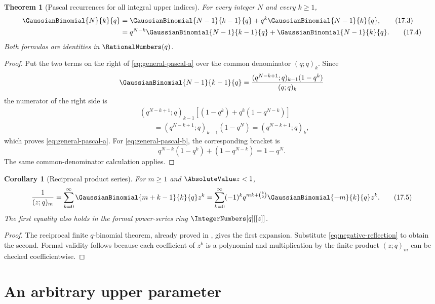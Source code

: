 \documentclass[11pt,a4paper,oneside,openany]{book}
\newtheorem{theorem}{Theorem}[chapter]
\newtheorem{corollary}[corollary]{Corollary}
\theoremstyle{definition}
\theoremstyle{remark}
\begin{document}
\begin{theorem}[Pascal recurrences for all integral upper indices]\label{thm:generalized-pascal}
For every integer $N$ and every $k\ge1$,
\begin{align}
 \GaussianBinomial{N}{k}{q}
 &=\GaussianBinomial{N-1}{k-1}{q}+q^k\GaussianBinomial{N-1}{k}{q},
 \tag{17.3}\label{eq:general-pascal-a}\\
 &=q^{N-k}\GaussianBinomial{N-1}{k-1}{q}+\GaussianBinomial{N-1}{k}{q}.
 \tag{17.4}\label{eq:general-pascal-b}
\end{align}
Both formulas are identities in $\RationalNumbers(q)$.
\end{theorem}

\begin{proof}
Put the two terms on the right of \eqref{eq:general-pascal-a} over the common denominator $(q;q)_k$.  Since
\[
 \GaussianBinomial{N-1}{k-1}{q}
 =\frac{(q^{N-k+1};q)_{k-1}(1-q^k)}{(q;q)_k}
\]
the numerator of the right side is
\begin{align*}
 &(q^{N-k+1};q)_{k-1}
 \left[(1-q^k)+q^k(1-q^{N-k})\right]\\
 &\qquad=(q^{N-k+1};q)_{k-1}(1-q^N)
 =(q^{N-k+1};q)_k,
\end{align*}
which proves \eqref{eq:general-pascal-a}.  For \eqref{eq:general-pascal-b}, the corresponding bracket is
\[
 q^{N-k}(1-q^k)+(1-q^{N-k})=1-q^N.
\]
The same common-denominator calculation applies.
\end{proof}

\begin{corollary}[Reciprocal product series]\label{cor:reciprocal-product-negative}
For $m\ge1$ and $\AbsoluteValue z<1$,
\[
 \frac1{(z;q)_m}
 =\sum_{k=0}^{\infty}\GaussianBinomial{m+k-1}{k}{q} z^k
 =\sum_{k=0}^{\infty}(-1)^kq^{mk+\binom k2}
   \GaussianBinomial{-m}{k}{q}z^k.
 \tag{17.5}\label{eq:negative-reciprocal-series}
\]
The first equality also holds in the formal power-series ring $\IntegerNumbers[q][[z]]$.
\end{corollary}

\begin{proof}
The reciprocal finite $q$-binomial theorem, already proved in , gives the first expansion.  Substitute \eqref{eq:negative-reflection} to obtain the second.  Formal validity follows because each coefficient of $z^k$ is a polynomial and multiplication by the finite product $(z;q)_m$ can be checked coefficientwise.
\end{proof}

\section{An arbitrary upper parameter}
\end{document}
